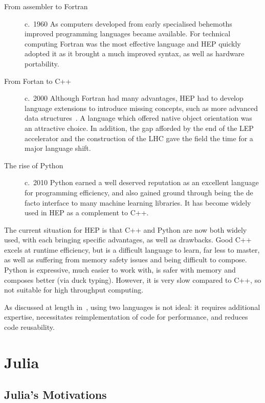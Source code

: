 \documentclass{webofc}
\begin{document}
\begin{description}
    \item[From assembler to Fortran] c.~1960 As computers developed from early
    specialised behemoths improved programming
    languages became available. For technical computing Fortran was the most
    effective language and HEP quickly adopted it as it brought a much improved
    syntax, as well as hardware portability.
    \item[From Fortan to C++] c.~2000 Although Fortran had many advantages, HEP had to
    develop language extensions to introduce missing concepts, such as more advanced data
    structures~\cite{Zoll:2296399}. A language which offered native object
    orientation was an attractive choice. In addition, the gap afforded by the
    end of the LEP accelerator and the construction of the LHC gave the field
    the time for a major language shift.
    \item[The rise of Python] c.~2010 Python earned a well deserved reputation as an
    excellent language for programming efficiency, and also gained ground
    through being the de facto interface to many machine learning libraries. It
    has become widely used in HEP as a complement to C++.
\end{description}

The current situation for HEP is that C++ and Python are now both widely used,
with each bringing specific advantages, as well as drawbacks. Good C++ excels at
runtime efficiency, but is a difficult language to learn, far less to master, as well as
suffering from memory safety issues and being difficult to compose. Python is
expressive, much easier to work with, is safer with memory and composes better
(via duck typing). However, it is very slow compared to C++, so not suitable for
high throughput computing.

As discussed at length in~\cite{eschle2023potential}, using two languages is not ideal: it
requires additional expertise, necessitates reimplementation of code for
performance, and reduces code reusability.

\section{Julia}

\subsection{Julia's Motivations}
\end{document}

